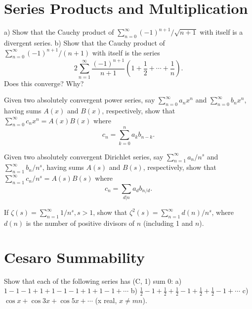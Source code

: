 \section{Series Products and Multiplication}

\begin{problembox}
    a) Show that the Cauchy product of \(\sum_{n=0}^{\infty} (-1)^{n+1}/\sqrt{n + 1}\) with itself is a divergent series.
    b) Show that the Cauchy product of \(\sum_{n=0}^{\infty} (-1)^{n+1}/(n + 1)\) with itself is the series
    \[2 \sum_{n=1}^{\infty} \frac{(-1)^{n+1}}{n + 1} \left( 1 + \frac{1}{2} + \cdots + \frac{1}{n} \right).\]
    Does this converge? Why?
    \end{problembox}
    
    \begin{problembox}
    Given two absolutely convergent power series, say \(\sum_{n=0}^{\infty} a_n x^n\) and \(\sum_{n=0}^{\infty} b_n x^n\), having sums \(A(x)\) and \(B(x)\), respectively, show that \(\sum_{n=0}^{\infty} c_n x^n = A(x) B(x)\) where
    \[c_n = \sum_{k=0}^{n} a_k b_{n-k}.\]
    \end{problembox}
    
    \begin{problembox}
    Given two absolutely convergent Dirichlet series, say \(\sum_{n=1}^{\infty} a_n / n^s\) and \(\sum_{n=1}^{\infty} b_n / n^s\), having sums \(A(s)\) and \(B(s)\), respectively, show that \(\sum_{n=1}^{\infty} c_n / n^s = A(s) B(s)\) where
    \[c_n = \sum_{d|n} a_d b_{n/d}.\]
    \end{problembox}
    
    \begin{problembox}
    If \(\zeta(s) = \sum_{n=1}^{\infty} 1/n^s, s > 1\), show that \(\zeta^2(s) = \sum_{n=1}^{\infty} d(n) / n^s\), where \(d(n)\) is the number of positive divisors of \(n\) (including 1 and \(n\)).
    \end{problembox}

\section{Cesaro Summability}

\begin{problembox}
    Show that each of the following series has (C, 1) sum 0:
    a) \(1 - 1 - 1 + 1 + 1 - 1 - 1 + 1 + 1 - 1 + \cdots\)
    b) \(\frac{1}{2} - 1 + \frac{1}{2} + \frac{1}{2} - 1 + \frac{1}{2} + \frac{1}{2} - 1 + \cdots\)
    c) \(\cos x + \cos 3x + \cos 5x + \cdots\) (x real, \(x \neq mn\)).
    \end{problembox}
    
